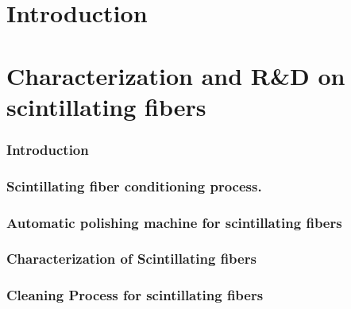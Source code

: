 \documentclass[12pt,a4paper]{book}
\begin{document}
	\section{Introduction}\label{sec:IntroCharacterisation}
	
	\newpage
	
	\section[Fibers characetrization]{Characterization and R\&D on scintillating fibers}\label{sec:CharacterizationScintillatingFibers}
	
		\subsubsection{Introduction}\label{subsubsec:IntroFibersResults}
		
		
		\subsubsection[Conditioning process]{Scintillating fiber conditioning process.}\label{subsubsec:ConditioningProcess}
		
		
		
		\subsubsection{Automatic polishing machine for scintillating fibers}\label{subsubsec:PolishingMachine}
		
		
		\subsubsection{Characterization of Scintillating fibers}\label{subsubsec:CharacterizationFibers}
		
		
		\subsubsection{Cleaning Process for scintillating fibers}\label{subsubsec:CleaningProcess}
		
		\newpage
		
\end{document}
